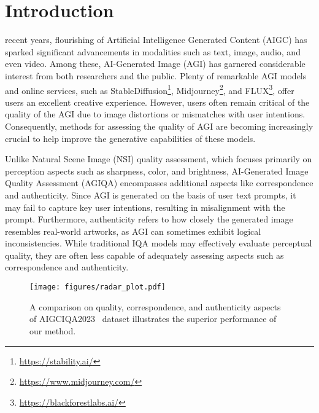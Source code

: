 

\section{Introduction}
 recent years, flourishing of Artificial Intelligence Generated Content (AIGC) has sparked significant advancements in modalities such as text, image, audio, and even video. 
Among these, AI-Generated Image (AGI) has garnered considerable interest from both researchers and the public.
Plenty of remarkable AGI models and online services, such as StableDiffusion\footnote{\url{https://stability.ai/}}, Midjourney\footnote{\url{https://www.midjourney.com/}}, and FLUX\footnote{\url{https://blackforestlabs.ai/}}, offer users an excellent creative experience.
However, users often remain critical of the quality of the AGI due to image distortions or mismatches with user intentions.
Consequently, methods for assessing the quality of AGI are becoming increasingly crucial to help improve the generative capabilities of these models.

Unlike Natural Scene Image (NSI) quality assessment, which focuses primarily on perception aspects such as sharpness, color, and brightness, AI-Generated Image Quality Assessment (AGIQA) encompasses additional aspects like correspondence and authenticity. 
Since AGI is generated on the basis of user text prompts, it may fail to capture key user intentions, resulting in misalignment with the prompt.
Furthermore, authenticity refers to how closely the generated image resembles real-world artworks, as AGI can sometimes exhibit logical inconsistencies.
While traditional IQA models may effectively evaluate perceptual quality, they are often less capable of adequately assessing aspects such as correspondence and authenticity.

\begin{figure}\label{fig:radar}
    \centering
    \texttt{[image: figures/radar\_plot.pdf]}
    \caption{A comparison on quality, correspondence, and authenticity aspects of AIGCIQA2023~\cite{wang2023aigciqa2023} dataset illustrates the superior performance of our method.}
\end{figure}

